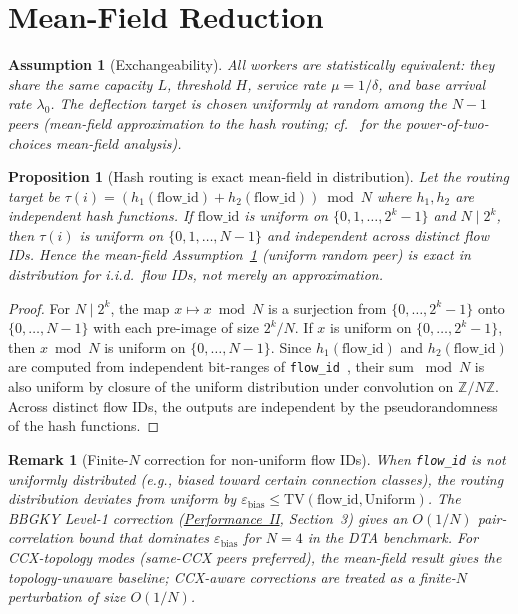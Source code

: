 \documentclass[11pt,a4paper]{report}
\newtheorem{proposition}[theorem]{Proposition}
\newtheorem{assumption}{Assumption}[section]
\newtheorem{remark}{Remark}[section]
\newcommand{\code}[1]{\texttt{#1}}
\begin{document}
\section{Mean-Field Reduction}

\begin{assumption}[Exchangeability]
\label{ass:exch}
All workers are statistically equivalent: they share the same
capacity $L$, threshold $H$, service rate $\mu = 1/\delta$, and
base arrival rate $\lambda_0$.  The deflection target is chosen
uniformly at random among the $N-1$ peers (mean-field
approximation to the hash routing;
cf.~\cite{mitzenmacher2001,vvedenskaya1996} for the power-of-two-choices mean-field analysis).
\end{assumption}

\begin{proposition}[Hash routing is exact mean-field in distribution]
\label{prop:hash_mf}
Let the routing target be $\tau(i) = (h_1(\mathrm{flow\_id}) + h_2(\mathrm{flow\_id})) \bmod N$
where $h_1, h_2$ are independent hash functions.
If $\mathrm{flow\_id}$ is uniform on $\{0, 1, \ldots, 2^k - 1\}$ and $N \mid 2^k$,
then $\tau(i)$ is uniform on $\{0, 1, \ldots, N-1\}$ and independent across
distinct flow IDs.
Hence the mean-field Assumption~\ref{ass:exch} (uniform random peer) is
\emph{exact in distribution} for i.i.d.\ flow IDs, not merely an approximation.
\end{proposition}

\begin{proof}
For $N \mid 2^k$, the map $x \mapsto x \bmod N$ is a surjection from
$\{0,\ldots,2^k-1\}$ onto $\{0,\ldots,N-1\}$ with each pre-image of size $2^k/N$.
If $x$ is uniform on $\{0,\ldots,2^k-1\}$, then $x \bmod N$ is uniform on
$\{0,\ldots,N-1\}$.  Since $h_1(\mathrm{flow\_id})$ and $h_2(\mathrm{flow\_id})$
are computed from independent bit-ranges of \code{flow\_id}~\cite{dtact_source},
their sum $\bmod N$ is also uniform by closure of the uniform distribution
under convolution on $\mathbb{Z}/N\mathbb{Z}$.
Across distinct flow IDs, the outputs are independent by the pseudorandomness
of the hash functions.
\end{proof}

\begin{remark}[Finite-$N$ correction for non-uniform flow IDs]
When \code{flow\_id} is \emph{not} uniformly distributed (e.g., biased
toward certain connection classes), the routing distribution deviates from
uniform by $\varepsilon_{\mathrm{bias}} \le \mathrm{TV}(\mathrm{flow\_id}, \mathrm{Uniform})$.
The BBGKY Level-1 correction (\hyperref[chap:kinetic_theory]{Performance~II},
Section~3) gives an $O(1/N)$ pair-correlation bound that dominates
$\varepsilon_{\mathrm{bias}}$ for $N=4$ in the DTA benchmark.
For CCX-topology modes (same-CCX peers preferred), the mean-field result
gives the \emph{topology-unaware} baseline; CCX-aware corrections are
treated as a finite-$N$ perturbation of size $O(1/N)$.
\end{remark}
\end{document}
